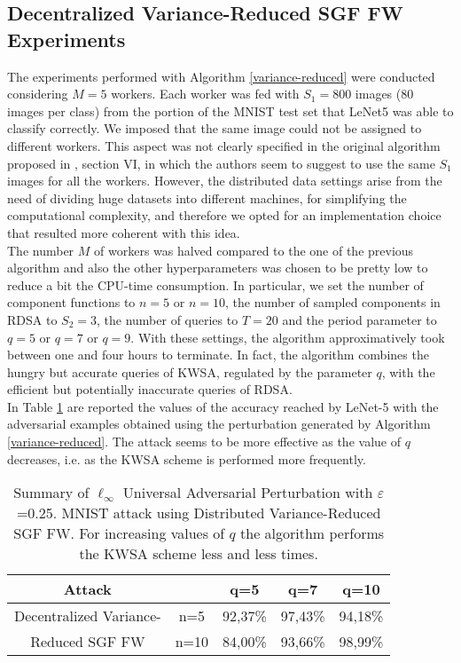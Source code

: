\subsection{Decentralized Variance-Reduced SGF FW Experiments}
The experiments performed with Algorithm \ref{variance-reduced} were conducted considering $M=5$ workers. Each worker was fed with $S_1=800$ images (80 images per class) from the portion of the MNIST test set that LeNet5 was able to classify correctly. We imposed that the same image could not be assigned to different workers. This aspect was not clearly specified in the original algorithm proposed in \cite{A3}, section VI, in which the authors seem to suggest to use the same $S_1$ images for all the workers. However, the distributed data settings arise from the need of dividing huge datasets into different machines, for simplifying the computational complexity, and therefore we opted for an implementation choice that resulted more coherent with this idea.\\  \indent The number $M$ of workers was halved compared to the one of the previous algorithm and also the other hyperparameters was chosen to be pretty low to reduce a bit the CPU-time consumption. In particular, we set the number of component functions to $n=5$ or $n=10$, the number of sampled components in RDSA to $S_2=3$, the number of queries to $T=20$ and the period parameter to $q=5$ or $q=7$ or $q=9$. With these settings, the algorithm approximatively took between one and four hours to terminate. In fact, the algorithm combines the hungry but accurate queries of KWSA, regulated by the parameter $q$, with the efficient but potentially inaccurate queries of RDSA.\\
\indent In Table \ref{tab:vr} are reported the values of the accuracy reached by LeNet-5 with the adversarial examples obtained using the perturbation generated by Algorithm \ref{variance-reduced}. The attack seems to be more effective as the value of $q$ decreases, i.e. as the KWSA scheme is performed more frequently.\\
\begin{table}[htbp]
	\begin{center}
		\begin{adjustwidth}{-.6cm}{}
			\begin{tabular}{c|cccc}
				\textbf{Attack} &    &      q=5 &      q=7 &     q=10 \\
				\midrule
				{\small Decentralized Variance-}  & n=5   &    92,37\% &    97,43\% &       94,18\% \\
				{\small Reduced SGF FW}     &  n=10&  84,00\% &    93,66\% &       98,99\% \\
			\end{tabular}
		\end{adjustwidth}
	\end{center}
\caption{{\small Summary of $\ell_\infty$ Universal Adversarial Perturbation with $\varepsilon$=0.25. MNIST attack using Distributed Variance-Reduced
		SGF FW. For increasing values of $q$ the algorithm performs the KWSA scheme less and less times.}}
	\label{tab:vr}
\end{table}
